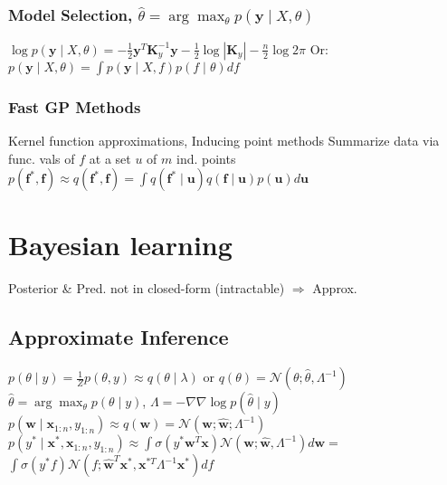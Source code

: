 \documentclass[a4paper, 11pt, landscape]{article}
\begin{document}
\begin{multicols*}{3}
\subsubsection{Model Selection, \space\space $\hat{\theta} = \arg\max_\theta p(\mathbf{y} \mid X, \theta)$}
$\log p(\mathbf{y} \mid X, \theta)=-\frac{1}{2} \mathbf{y}^{T} \mathbf{K}_{y}^{-1} \mathbf{y}-\frac{1}{2} \log \left|\mathbf{K}_{y}\right|-\frac{n}{2} \log 2 \pi$
\newline Or: $p(\mathbf{y} \mid X, \theta) = \int p(\mathbf{y} \mid X, f) p(f \mid \theta) df$

\subsubsection{Fast GP Methods}
Kernel function approximations, Inducing point methods
\newline Summarize data via func. vals of $f$ at a set $u$ of $m$ ind. points
\newline $p\left(\mathbf{f}^{*}, \mathbf{f}\right) \approx q\left(\mathbf{f}^{*}, \mathbf{f}\right)=\int q\left(\mathbf{f}^{*} \mid \mathbf{u}\right) q(\mathbf{f} \mid \mathbf{u}) p(\mathbf{u}) d \mathbf{u}$

\section{Bayesian learning}
Posterior \& Pred. not in closed-form (intractable) $\Rightarrow$ Approx.

\subsection{Approximate Inference}
$p(\theta \mid y)=\frac{1}{Z} p(\theta, y) \approx q(\theta \mid \lambda)$ or $q(\theta) =\mathcal{N}\left(\theta ; \hat{\theta}, \Lambda^{-1}\right)$
\newline $ \hat{\theta} =\arg \max _{\theta} p(\theta \mid y)$, \space $\Lambda=-\nabla \nabla \log p(\hat{\theta} \mid y)$
\newline $p\left(\mathbf{w} \mid \mathbf{x}_{1: n}, y_{1: n}\right) \approx q(\mathbf{w})=\mathcal{N}\left(\mathbf{w} ; \hat{\mathbf{w}} ; \Lambda^{-1}\right)$
\newline $p\left(y^{*} \mid \mathbf{x}^{*}, \mathbf{x}_{1: n}, y_{1: n}\right) \approx \int \sigma\left(y^{*} \mathbf{w}^{T} \mathbf{x}\right) \mathcal{N}\left(\mathbf{w} ; \hat{\mathbf{w}}, \Lambda^{-1}\right) d \mathbf{w} =$
\newline $\int \sigma\left(y^{*} f\right) \mathcal{N}\left(f ; \hat{\mathbf{w}}^{T} \mathbf{x}^{*}, \mathbf{x}^{* T} \Lambda^{-1} \mathbf{x}^{*}\right) d f$


\end{multicols*}
\end{document}
